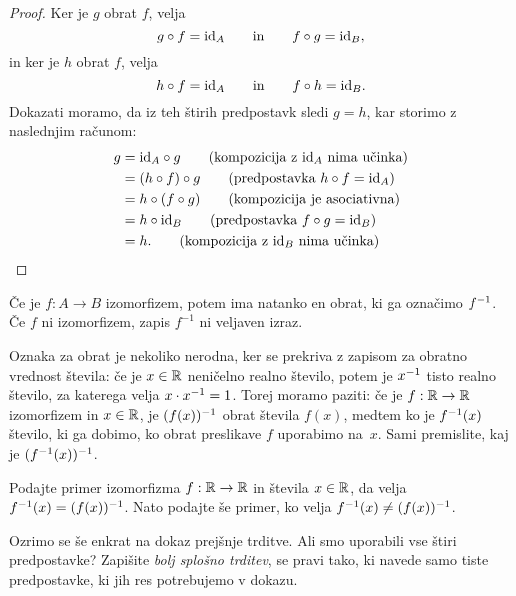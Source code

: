 \begin{proof}
  Ker je $g$ obrat $f$, velja
  \begin{equation*}
    g \circ f = \id[A]
    \qquad\text{in}\qquad
    f \circ g = \id[B],
  \end{equation*}
  in ker je $h$ obrat $f$, velja
  \begin{equation*}
    h \circ f = \id[A]
    \qquad\text{in}\qquad
    f \circ h = \id[B].
  \end{equation*}
  Dokazati moramo, da iz teh štirih predpostavk sledi $g = h$, kar storimo z naslednjim
  računom:
  \begin{align*}
    g
    &= \id[A] \circ g \tag{kompozicija z $\id[A]$ nima učinka} \\
    &= (h \circ f) \circ g \tag{predpostavka $h \circ f = \id[A]$} \\
    &= h \circ (f \circ g) \tag{kompozicija je asociativna} \\
    &= h \circ \id[B] \tag{predpostavka $f \circ g = \id[B]$} \\
    &= h. \tag{kompozicija z $\id[B]$ nima učinka}
  \end{align*}
\end{proof}

Če je $f : A \to B$ izomorfizem, potem ima natanko en obrat, ki ga označimo $\inv{f}$. Če
$f$ ni izomorfizem, zapis $f^{-1}$ ni veljaven izraz.

Oznaka za obrat je nekoliko nerodna, ker se prekriva z zapisom za obratno vrednost
števila: če je $x \in \RR$ neničelno realno število, potem je $\inv{x}$ tisto realno
število, za katerega velja $x \cdot \inv{x} = 1$. Torej moramo paziti: če je
$f : \RR \to \RR$ izomorfizem in $x \in \RR$, je $\inv{(f(x))}$ obrat števila $f(x)$,
medtem ko je $\inv{f}(x)$ število, ki ga dobimo, ko obrat preslikave $f$ uporabimo na~$x$.
Sami premislite, kaj je $\inv{(\inv{f}(x))}$.

\begin{naloga}
  Podajte primer izomorfizma $f : \RR \to \RR$ in števila $x \in \RR$, da velja
  $\inv{f}(x) = \inv{(f(x))}$. Nato podajte še primer, ko velja
  $\inv{f}(x) \neq \inv{(f(x))}$.
\end{naloga}

\begin{naloga}
  Ozrimo se še enkrat na dokaz prejšnje trditve. Ali smo uporabili vse štiri predpostavke?
  Zapišite \emph{bolj splošno trditev}, se pravi tako, ki navede samo tiste predpostavke,
  ki jih res potrebujemo v dokazu.
\end{naloga}

